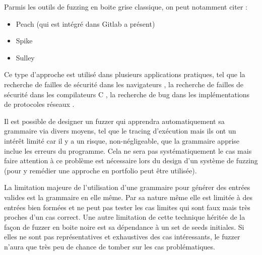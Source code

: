 \documentclass[a4paper]{report}
\begin{document}
Parmis les outils de fuzzing en boite grise classique, on peut notamment citer \cite{sutton2007fuzzing}:
\begin{itemize}
\item Peach (qui est intégré dans Gitlab a présent) \cite{peach}
\item Spike \cite{spike}
\item Sulley \cite{sulley}
\end{itemize}




Ce type d'approche est utilisé dans plusieurs applications pratiques, tel que la recherche de failles de sécurité dans les navigateurs \cite{holler2012fuzzing}, la recherche de failles de sécurité dans les compilateurs C \cite{yang2011finding}, la recherche de bug dans les implémentations de protocoles réseaux \cite{aflnet}.


Il est possible de designer un fuzzer qui apprendra automatiquement sa grammaire via divers moyens, tel que le tracing d'exécution \cite{hoschele2017mining} mais ils ont un intérêt limité car il y a un risque, non-négligeable, que la grammaire apprise inclue les erreurs du programme.
Cela ne sera pas systématiquement le cas mais faire attention à ce problème est nécessaire lors du design d'un système de fuzzing (pour y remédier une approche en portfolio peut être utilisée).

La limitation majeure de l'utilisation d'une grammaire pour générer des entrées valides est la grammaire en elle même.
Par sa nature même elle est limitée à des entrées bien formées et ne peut pas tester les cas limites qui sont faux mais très proches d'un cas correct.
Une autre limitation de cette technique héritée de la façon de fuzzer en boite noire est sa dépendance à un set de seeds initiales.
Si elles ne sont pas représentatives et exhaustives des cas intéressants, le fuzzer n'aura que très peu de chance de tomber sur les cas problématiques.
\end{document}
